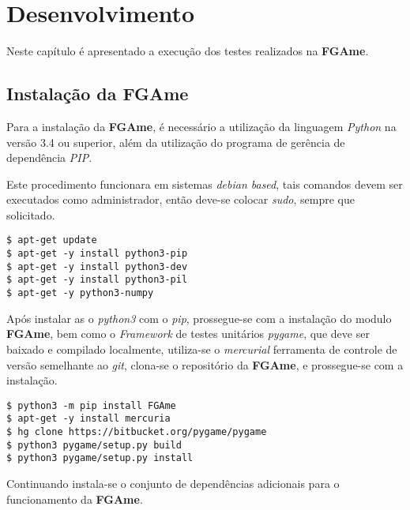\pagestyle{empty}

\chapter{Desenvolvimento}

Neste capítulo é apresentado a execução dos testes realizados na \textbf{FGAme}.

\section{Instalação da \textbf{FGAme}}
Para a instalação da \textbf{FGAme}, é necessário a utilização da linguagem \textit{Python} na versão 3.4 ou superior, além da utilização do programa de gerência de dependência \textit{PIP}.

Este procedimento funcionara em sistemas \textit{debian based}, tais comandos devem ser executados como administrador, então deve-se colocar \textit{sudo}, sempre que solicitado.

\begin{lstlisting}
$ apt-get update
$ apt-get -y install python3-pip
$ apt-get -y install python3-dev
$ apt-get -y install python3-pil
$ apt-get -y python3-numpy 
\end{lstlisting}

Após instalar as o \textit{python3} com o \textit{pip}, prossegue-se com a instalação do modulo \textbf{FGAme}, bem como o \textit{Framework} de testes unitários \textit{pygame}, que deve ser baixado e compilado localmente, utiliza-se o \textit{mercurial} ferramenta de controle de versão semelhante ao \textit{git}, clona-se o repositório da \textbf{FGAme}, e prossegue-se com a instalação.

\begin{lstlisting}
$ python3 -m pip install FGAme
$ apt-get -y install mercuria
$ hg clone https://bitbucket.org/pygame/pygame
$ python3 pygame/setup.py build
$ python3 pygame/setup.py install
\end{lstlisting}

Continuando instala-se o conjunto de dependências adicionais para o funcionamento da \textbf{FGAme}.

